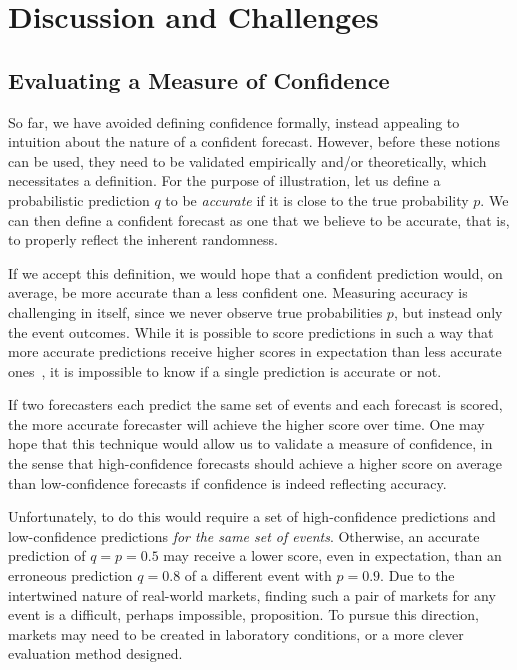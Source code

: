 \documentclass[sigconf,anonymous]{aamas}   %
\begin{document}

\section{Discussion and Challenges}
\label{sec:discussion}

\subsection{Evaluating a Measure of Confidence}
\label{sec:evaluation}

So far, we have avoided defining confidence formally, instead appealing to intuition about the nature of a confident forecast. However, before these notions can be used, they need to be validated empirically and/or theoretically, which necessitates a definition. 
For the purpose of illustration, let us define a probabilistic prediction $q$ to be \emph{accurate} if it is close to the true probability $p$. 
We can then define a confident forecast as one that we believe to be accurate, that is, to properly reflect the inherent randomness.

If we accept this definition, we would hope that a confident prediction would, on average, be more accurate than a less confident one. 
Measuring accuracy is challenging in itself, since we never observe true probabilities $p$, but instead only the event outcomes. While it is possible to score predictions in such a way that more accurate predictions receive higher scores in expectation than less accurate ones~\cite{brier1950verification,gneiting2007strictly}, it is impossible to know if a single prediction is accurate or not.

If two forecasters each predict the same set of events and each forecast is scored, the more accurate forecaster will achieve the higher score
over time. 
One may hope that this technique would allow us to validate a measure of confidence, in the sense that high-confidence forecasts should achieve a higher score on average than low-confidence forecasts if confidence is indeed reflecting accuracy.

Unfortunately, to do this would require a set of high-confidence predictions and low-confidence predictions \emph{for the same set of events}. Otherwise, an accurate prediction of $q=p=0.5$ may receive a lower score, even in expectation, than an erroneous prediction $q=0.8$ of a different event with $p=0.9$. Due to the intertwined nature of real-world markets, finding such a pair of markets for any event is a difficult, perhaps impossible, proposition. To pursue this direction, markets may need to be created in laboratory conditions, or a more clever evaluation method designed.
\end{document}
